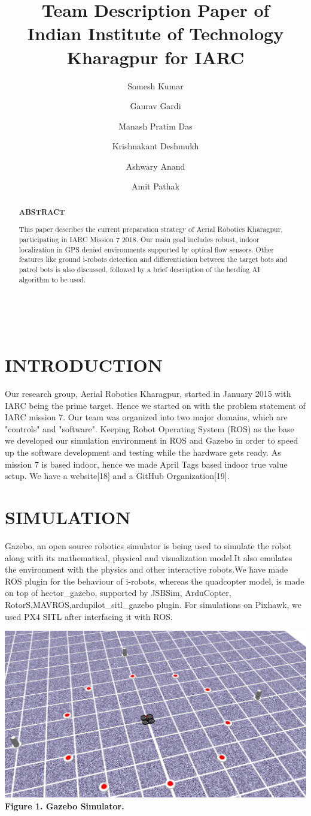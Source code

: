\documentclass[12pt]{article}
\title{Team Description Paper of \\
Indian Institute of Technology Kharagpur for IARC}
\author[**]{Somesh Kumar}
\author[*]{Gaurav Gardi}
\author[*]{Manash Pratim Das}
\author[*]{Krishnakant Deshmukh}
\author[*]{Ashwary Anand}
\author[*]{Amit Pathak}
\affil[*]{Students\\ Indian Institute of Technology, Kharagpur}
\affil[**]{Professor\\ Depeartment of Mathematics\\Indian Institute of Technology, Kharagpur}
\begin{document}
\maketitle
\\

\begin{abstract}

\begin{center}\textbf{ABSTRACT}\end{center}
This paper describes the current preparation strategy of Aerial Robotics Kharagpur,
participating in IARC Mission 7 2018. Our main goal includes robust, indoor 
localization in GPS denied environments supported by optical flow sensors. 
Other features like ground i-robots detection and differentiation between the 
target bots and patrol bots is also discussed, followed by a brief description 
of the herding AI algorithm to be used.
\end{abstract}
\section{INTRODUCTION}
Our research group, Aerial Robotics Kharagpur, started in January 2015 with IARC 
being the prime target. Hence we started on with the problem statement of IARC 
mission 7. Our team was organized into two major domains, which are "controls" 
and "software". Keeping Robot Operating System (ROS) as the base we developed 
our simulation environment in ROS and Gazebo in order to speed up the software 
development and testing while the hardware gets ready. As mission 7 is based 
indoor, hence we made April Tags based indoor true value setup. We have a website[18] 
and a GitHub Organization[19].
\section{SIMULATION}
Gazebo, an open source robotics simulator is being used to simulate the robot along with its mathematical, physical and visualization model.It also emulates the environment with the physics and other interactive robots.We have made ROS plugin for the behaviour of i-robots, whereas the quadcopter model,
is made on top of hector\_gazebo, supported by JSBSim, ArduCopter, RotorS,MAVROS,ardupilot\_sitl\_gazebo plugin. For simulations on Pixhawk, we used PX4 SITL after interfacing it with ROS.
\begin{center}\includegraphics[scale=0.15]{sim} \\
\textbf{Figure 1. Gazebo Simulator.}\end{center}
\end{document}
